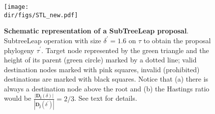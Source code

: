 \begin{figure}[!ht]
\begin{center}
\texttt{[image: \\dir/figs/STL\_new.pdf]} 
\end{center}
 \caption[Schematic representation of a SubTreeLeap proposal]{\textbf{Schematic representation of a SubTreeLeap proposal}.
 SubtreeLeap operation with size  $\delta^\prime = 1.6$ on $\tau$ to obtain the proposal phylogeny $\tau^\prime$.
 Target node represented by the green triangle and the height of its parent (green circle) marked by a dotted line; valid destination nodes marked with pink squares, invalid (prohibited) destinations are marked with black squares.
 Notice that (a) there is always a destination node above the root and (b) the Hastings ratio would be $ \frac{|\mathbf{D_i}(\delta)|}{|\mathbf{D_j}(\delta^\prime)|} = 2/3$.
 See text for details.
}
 \label{fig:stl}
\end{figure}


